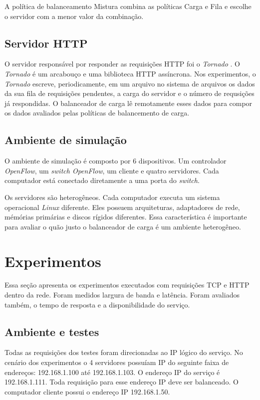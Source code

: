 A política de balanceamento Mistura combina as políticas Carga e Fila 
e escolhe o servidor com a menor valor da combinação.

\subsection{Servidor HTTP}

O servidor responsável por responder as requisições HTTP foi o 
\emph{Tornado} \citep{tornado}.
O \emph{Tornado} é um arcabouço e uma biblioteca HTTP assíncrona.
Nos experimentos, o \emph{Tornado} escreve, periodicamente, em um arquivo 
no sistema de arquivos os dados da sua fila de requisições pendentes,
a carga do servidor e o número de requsições já respondidas.
O balanceador de carga lê remotamente esses dados para compor os 
dados avaliados pelas políticas de balancemento de carga.

\subsection{Ambiente de simulação}

O ambiente de simulação é composto por 6 dispositivos.
Um controlador \emph{OpenFlow}, um \emph{switch OpenFlow}, um 
cliente e quatro servidores.
Cada computador está conectado diretamente a uma porta do \emph{switch}.

Os servidores são heterogêneos.
Cada computador executa um sistema operacional \emph{Linux} diferente.
Eles possuem arquiteturas, adaptadores de rede, mémórias primárias
e discos rígidos diferentes.
Essa característica é importante para avaliar o quão justo o balanceador 
de carga é um ambiente heterogêneo.

\section{Experimentos}

Essa seção apresenta os experimentos executados com requisições TCP e HTTP
dentro da rede.
Foram medidos largura de banda e latência.
Foram avaliados também, o tempo de resposta e a disponibilidade do serviço.

\subsection{Ambiente e testes}

Todas as requisições dos testes foram direcionadas ao IP lógico do 
serviço.
No cenário dos experimentos o 4 servidores possuíam IP do seguinte faixa de 
endereços: 192.168.1.100 até 192.168.1.103.
O endereço IP do serviço é 192.168.1.111.
Toda requisição para esse endereço IP deve ser balanceado.
O computador cliente possui o endereço IP 192.168.1.50.

